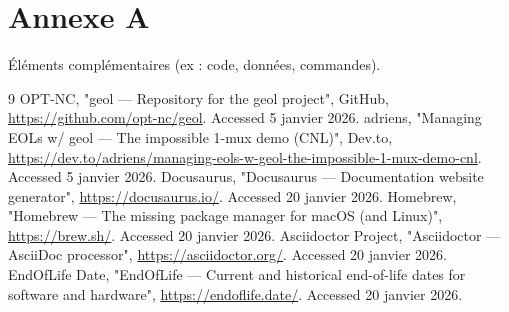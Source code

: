 \documentclass[12pt,a4paper]{report}
\begin{document}
\appendix
\chapter*{Annexe A}
Éléments complémentaires (ex : code, données, commandes).

\cleardoublepage
\begin{thebibliography}{9}
OPT-NC, "geol — Repository for the geol project", GitHub, \url{https://github.com/opt-nc/geol}. Accessed 5 janvier 2026.
adriens, "Managing EOLs w/ geol — The impossible 1-mux demo (CNL)", Dev.to, \url{https://dev.to/adriens/managing-eols-w-geol-the-impossible-1-mux-demo-cnl}. Accessed 5 janvier 2026.
Docusaurus, "Docusaurus — Documentation website generator", \url{https://docusaurus.io/}. Accessed 20 janvier 2026.
Homebrew, "Homebrew — The missing package manager for macOS (and Linux)", \url{https://brew.sh/}. Accessed 20 janvier 2026.
Asciidoctor Project, "Asciidoctor — AsciiDoc processor", \url{https://asciidoctor.org/}. Accessed 20 janvier 2026.
EndOfLife Date, "EndOfLife — Current and historical end-of-life dates for software and hardware", \url{https://endoflife.date/}. Accessed 20 janvier 2026.
\end{thebibliography}
\end{document}
